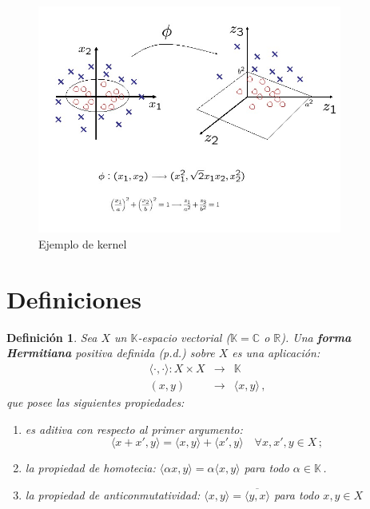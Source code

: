 \documentclass[12pt,reqno]{amsart}
\newtheorem*{mydef}{Definici\'on}
\begin{document}
\begin{figure}[ht!]
\centering
\includegraphics[width=100mm]{img/ejemplo.jpg}
\caption{Ejemplo de kernel}
\label{ejemplo}
\end{figure}








\bigskip
\section{Definiciones}\label{sec:def}

\begin{mydef}
Sea $X$ un $\mathbb{K}$-espacio vectorial
{\rm ($\mathbb{K}=\mathbb{C}$ o $\mathbb{R}$)}. 
Una \textbf{forma Hermitiana} positiva definida (p.d.) sobre $X$
es una aplicaci\'on:
\begin{eqnarray*}
\langle\cdot,\cdot\rangle: X\times X & \rightarrow & \mathbb{K} \\
(x,y) & \rightarrow & \langle x,y \rangle\,,
\end{eqnarray*}
que posee las siguientes propiedades:
\begin{enumerate}
\item
es aditiva con respecto al primer argumento:
$$
\langle x+x',y \rangle = \langle x,y \rangle + \langle x',y \rangle
\quad \forall x,x',y \in X\,;
$$
\item
la propiedad de homotecia:
$\langle\alpha x,y\rangle = \alpha\langle x,y\rangle$ 
para todo $\alpha\in\mathbb{K}$\,.
\item
la propiedad de anticonmutatividad:
$\langle x,y\rangle=\overline{\langle y,x\rangle}$
para todo $x,y\in X$
\end{enumerate}
\end{mydef}
\end{document}
